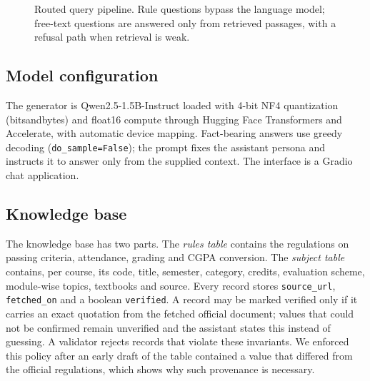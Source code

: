 \documentclass[conference]{IEEEtran}
\begin{document}
\begin{figure}[t]
\centering
{}
\caption{Routed query pipeline. Rule questions bypass the language model; free-text questions are answered only from retrieved passages, with a refusal path when retrieval is weak.}
\label{fig:arch}
\end{figure}

\subsection{Model configuration}
The generator is Qwen2.5-1.5B-Instruct loaded with 4-bit NF4 quantization (bitsandbytes) and float16 compute through Hugging Face Transformers and Accelerate, with automatic device mapping. Fact-bearing answers use greedy decoding (\texttt{do\_sample=False}); the prompt fixes the assistant persona and instructs it to answer only from the supplied context. The interface is a Gradio chat application.

\subsection{Knowledge base}
\label{sec:kb}
The knowledge base has two parts. The \emph{rules table} contains the regulations on passing criteria, attendance, grading and CGPA conversion. The \emph{subject table} contains, per course, its code, title, semester, category, credits, evaluation scheme, module-wise topics, textbooks and source. Every record stores \texttt{source\_url}, \texttt{fetched\_on} and a boolean \texttt{verified}. A record may be marked verified only if it carries an exact quotation from the fetched official document; values that could not be confirmed remain unverified and the assistant states this instead of guessing. A validator rejects records that violate these invariants. We enforced this policy after an early draft of the table contained a value that differed from the official regulations, which shows why such provenance is necessary.
\end{document}
